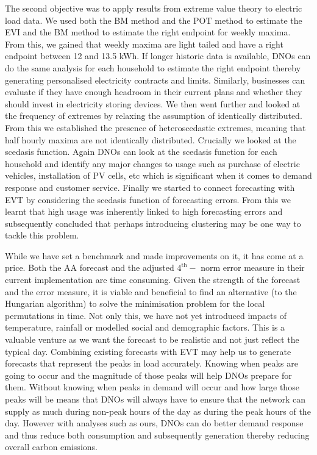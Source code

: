 The second objective was to apply results from extreme value theory to electric load data. We used both the BM method and the POT method to estimate the EVI and the BM method to estimate the right endpoint for weekly maxima. From this, we gained that weekly maxima are light tailed and have a right endpoint between 12 and 13.5 kWh. If longer historic data is available, DNOs can do the same analysis for each household to estimate the right endpoint thereby generating personalised electricity contracts and limits. Similarly, businesses can evaluate if they have enough headroom in their current plans and whether they should invest in electricity storing devices. We then went further and looked at the frequency of extremes by relaxing the assumption of identically distributed. From this we established the presence of heteroscedastic extremes, meaning that half hourly maxima are not identically distributed. Crucially we looked at the scedasis function. Again DNOs can look at the scedasis function for each household and identify any major changes to usage such as purchase of electric vehicles, installation of PV cells, etc which is significant when it comes to demand response and customer service. Finally we started to connect forecasting with EVT by considering the scedasis function of forecasting errors. From this we learnt that high usage was inherently linked to high forecasting errors and subsequently concluded that perhaps introducing clustering may be one way to tackle this problem.

While we have set a benchmark and made improvements on it, it has come at a price. Both the AA forecast and the adjusted $4^{\text{th}}-$ norm error measure in their current implementation are time consuming. Given the strength of the forecast and the error measure, it is viable and beneficial to find an alternative (to the Hungarian algorithm) to solve the minimisation problem for the local permutations in time. Not only this, we have not yet introduced impacts of temperature, rainfall or modelled social and demographic factors. This is a valuable venture as we want the forecast to be realistic and not just reflect the typical day. Combining existing forecasts with EVT may help us to generate forecasts that represent the peaks in load accurately. Knowing when peaks are going to occur and the magnitude of those peaks will help DNOs prepare for them. Without knowing when peaks in demand will occur and how large those peaks will be means that DNOs will always have to ensure that the network can supply as much during non-peak hours of the day as during the peak hours of the day. However with analyses such as ours, DNOs can do better demand response and thus reduce both consumption and subsequently generation thereby reducing overall carbon emissions. %


